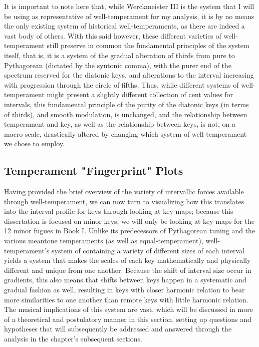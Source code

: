 It is important to note here that, while Werckmeister III is the system
that I will be using as representative of well-temperament for my
analysis, it is by no means the only existing system of historical
well-temperaments, as there are indeed a vast body of others. With this
said however, these different varieties of well-temperament still
preserve in common the fundamental principles of the system itself, that
is, it is a system of the gradual alteration of thirds from pure to
Pythagorean (dictated by the syntonic comma), with the purer end of the
spectrum reserved for the diatonic keys, and alterations to the interval
increasing with progression through the circle of fifths. Thus, while
different systems of well-temperament might present a slightly different
collection of cent values for intervals, this fundamental principle of
the purity of the diatonic keys (in terms of thirds), and smooth
modulation, is unchanged, and the relationship between temperament and
key, as well as the relationship between keys, is not, on a macro scale,
drastically altered by changing which system of well-temperament we
chose to employ.

    \subsection{Temperament "Fingerprint"
Plots}\label{temperament-fingerprint-plots}

Having provided the brief overview of the variety of intervallic forces
available through well-temperament, we can now turn to visualizing how
this translates into the interval profile for keys through looking at
key maps; because this dissertation is focused on minor keys, we will
only be looking at key maps for the 12 minor fugues in Book I. Unlike
its predecessors of Pythagorean tuning and the various meantone
temperaments (as well as equal-temperament), well-temperament's system
of containing a variety of different sizes of each interval yields a
system that makes the scales of each key mathematically and physically
different and unique from one another. Because the shift of interval
size occur in gradients, this also means that shifts between keys happen
in a systematic and gradual fashion as well, resulting in keys with
closer harmonic relation to bear more similarities to one another than
remote keys with little harmonic relation. The musical implications of
this system are vast, which will be discussed in more of a theoretical
and postulatory manner in this section, setting up questions and
hypotheses that will subsequently be addressed and answered through the
analysis in the chapter's subsequent sections.

